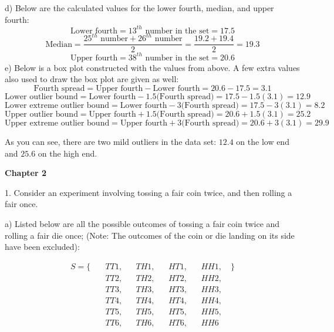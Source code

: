 \documentclass[12pt, letterpaper]{article}
\begin{document}
\qquad d) Below are the calculated values for the lower fourth, median, and upper fourth:
$$\text{Lower fourth}=13^{th}\text{ number in the set}=\boxed{17.5}$$
$$\text{Median}=\frac{25^{th}\text{ number}+26^{th}\text{ number}}{2}=\frac{19.2+19.4}{2}=\boxed{19.3}$$
$$\text{Upper fourth}=38^{th}\text{ number in the set}=\boxed{20.6}$$
\qquad e) Below is a box plot constructed with the values from above. A few extra values also used to draw the box plot are given as well:
$$\text{Fourth spread}=\text{Upper fourth}-\text{Lower fourth}=20.6-17.5=\boxed{3.1}$$
$$\text{Lower outlier bound}=\text{Lower fourth}-1.5\text{(Fourth spread)}=17.5-1.5(3.1)=\boxed{12.9}$$
$$\text{Lower extreme outlier bound}=\text{Lower fourth}-3\text{(Fourth spread)}=17.5-3(3.1)=\boxed{8.2}$$
$$\text{Upper outlier bound}=\text{Upper fourth}+1.5\text{(Fourth spread)}=20.6+1.5(3.1)=\boxed{25.2}$$
$$\text{Upper extreme outlier bound}=\text{Upper fourth}+3\text{(Fourth spread)}=20.6+3(3.1)=\boxed{29.9}$$
\begin{center}
\end{center}

As you can see, there are two mild outliers in the data set: $12.4$ on the low end and $25.6$ on the high end.

\pagebreak

\begin{center}
	\textbf{Chapter 2}
\end{center}

1. Consider an experiment involving tossing a fair coin twice, and then rolling a fair once.

\qquad a) Listed below are all the possible outcomes of tossing a fair coin twice and rolling a fair die once; (Note: The outcomes of the coin or die landing on its side have been excluded):
\begin{center}
	\begin{align*}
		S = \{\quad &TT1, & &TH1, & &HT1, & &HH1, \quad\} \\
			   		&TT2, & &TH2, & &HT2, & &HH2,		  \\
			 	  	&TT3, & &TH3, & &HT3, & &HH3,		  \\
			   		&TT4, & &TH4, & &HT4, & &HH4,		  \\
			   		&TT5, & &TH5, & &HT5, & &HH5,		  \\
			   		&TT6, & &TH6, & &HT6, & &HH6
	\end{align*}
\end{center}
\end{document}
